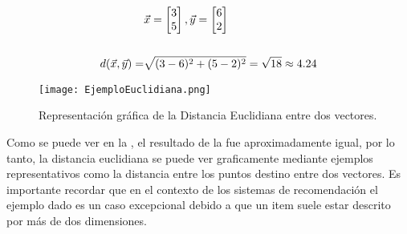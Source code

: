     \begin{equation}
        \begin{split}
            &\vec{x} = \begin{bmatrix}
                3
                \\
                5
            \end{bmatrix},  
            \vec{y} = \begin{bmatrix}
                6
                \\
                2
            \end{bmatrix}
            \\
            \\
            d(\vec{x}, \vec{y}) = &\sqrt{(3 - 6)^2 + (5 - 2)^2} = \sqrt{18} \approx 4.24
        \end{split}
        \addequation{Ejemplo de Distancia Euclidiana}
        \label{EjemploDistanciaEuclidiana}
    \end{equation}

    \begin{figure}[h!]
        \centering
        \texttt{[image: EjemploEuclidiana.png]}
        \caption{Representación gráfica de la Distancia Euclidiana entre dos vectores.}
        \label{fig: EjemploEuclidiana}
    \end{figure}

    \newpage

    Como se puede ver en la , el resultado de la  fue aproximadamente igual, por lo tanto, la distancia euclidiana se puede ver graficamente mediante ejemplos representativos como la distancia entre los puntos destino entre dos vectores. Es importante recordar que en el contexto de los sistemas de recomendación el ejemplo dado es un caso excepcional debido a que un item suele estar descrito por más de dos dimensiones.





    